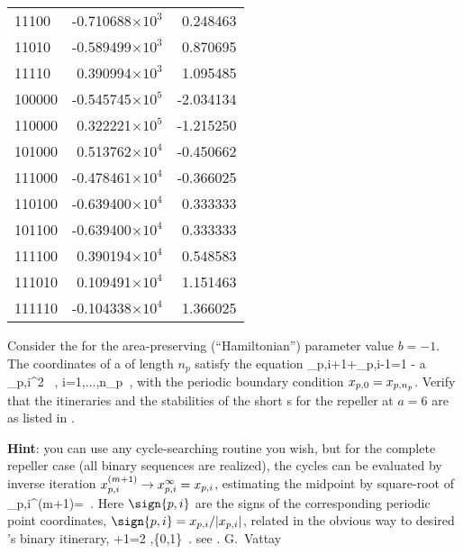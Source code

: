 {\begin{table}
{\begin{tabular}{lrr}
11100 &-0.710688$\times 10^3$ &  0.248463 \\
11010 &-0.589499$\times 10^3$ &  0.870695 \\
11110 & 0.390994$\times 10^3$ &  1.095485 \\
100000 &-0.545745$\times 10^5$ & -2.034134 \\
110000 & 0.322221$\times 10^5$ & -1.215250 \\
101000 & 0.513762$\times 10^4$ & -0.450662 \\
111000 &-0.478461$\times 10^4$ & -0.366025 \\
110100 &-0.639400$\times 10^4$ &  0.333333 \\
101100 &-0.639400$\times 10^4$ &  0.333333 \\
111100 & 0.390194$\times 10^4$ &  0.548583 \\
111010 & 0.109491$\times 10^4$ &  1.151463 \\
111110 &-0.104338$\times 10^4$ &  1.366025
\end{tabular}
} %
\end{table}
\renewcommand{\arraystretch}{1.0}

                                                \toCB
%
Consider the  {\HenonMap} 
for the area-preserving (``Hamiltonian'') parameter value $b=-1$.
The coordinates of a {\po} of
length $n_p$ satisfy the  equation
\beq
\ssp_{p,i+1}+\ssp_{p,i-1}=1 -  a \ssp_{p,i}^2 \, ,
\quad i=1,...,n_p
\,,
\label{pere}
\eeq
with the periodic boundary condition
$x_{p,0}=x_{p,n_p}$.
Verify that the itineraries and the stabilities of the short
{\po}s for the {\Henon} repeller 
at $a=6$ are as listed in .

{\bf Hint}: you can use any cycle-searching routine you wish, but for the
complete repeller case (all binary sequences are realized), the cycles
can be evaluated by inverse iteration
$x_{p,i}^{(m+1)}\to x_{p,i}^{\infty}=x_{p,i}$, estimating
the midpoint by square-root
of 
\beq
\ssp_{p,i}^{(m+1)}=
\,.
Here $\sign{p,i}$ are the
signs of the corresponding periodic point coordinates,
$\sign{p,i}=\ssp_{p,i}/|\ssp_{p,i}|$,
related in the obvious way to desired \po's binary itinerary,
\beq
{}+1=2\,\,,\quad {}\in\{0,1\}
\,.
see .
%
\hfill G.~Vattay
    } %

